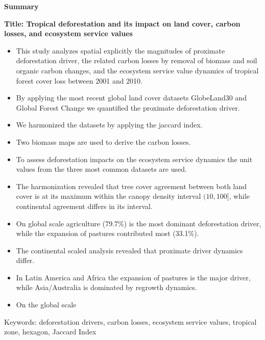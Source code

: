 \thispagestyle{empty}

\begin{center}
	\textbf{Summary}
\end{center}
\textbf{Title: Tropical deforestation and its impact on land cover, carbon losses, and ecosystem service values}

\begin{itemize}
	\item This study analyzes spatial explicitly the magnitudes of proximate deforestation driver, the related carbon losses by removal of biomass and soil organic carbon changes, and the ecosystem service value dynamics of tropical forest cover loss between 2001 and 2010.
	\item By applying the most recent global land cover datasets GlobeLand30 and Global Forest Change we quantified the proximate deforestation driver.
	\item We harmonized the datasets by applying the jaccard index.
	\item Two biomass maps are used to derive the carbon losses.
	\item To assess deforestation impacts on the ecosystem service dynamics the unit values from the three most common datasets are used.
	\item The harmonization revealed that tree cover agreement between both land cover is at its maximum within the canopy density interval $(10,100]$, while continental agreement differs in its interval.
	\item On global scale agriculture (79.7\%) is the most dominant deforestation driver, while the expansion of pastures contributed most (33.1\%).
	\item The continental scaled analysis revealed that proximate driver dynamics differ.
	\item In Latin America and Africa the expansion of pastures is the major driver, while Asia/Australia is dominated by regrowth dynamics.
	\item On the global scale 
\end{itemize}

Keywords: deforestation drivers, carbon losses, ecosystem service values, tropical zone, hexagon, Jaccard Index